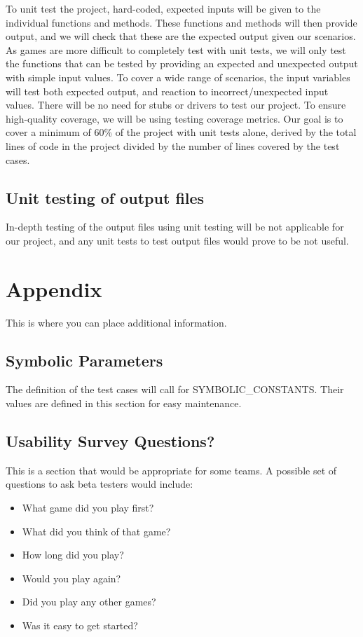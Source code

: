 \documentclass[12pt, titlepage]{article}
\begin{document}
To unit test the project, hard-coded, expected inputs will be given to the individual functions and methods. These functions and methods will then provide output, and we will check that these are the expected output given our scenarios. As games are more difficult to completely test with unit tests, we will only test the functions that can be tested by providing an expected and unexpected output with simple input values. To cover a wide range of scenarios, the input variables will test both expected output, and reaction to incorrect/unexpected input values. There will be no need for stubs or drivers to test our project. To ensure high-quality coverage, we will be using testing coverage metrics. Our goal is to cover a minimum of 60\% of the project with unit tests alone, derived by the total lines of code in the project divided by the number of lines covered by the test cases.
	
\subsection{Unit testing of output files}	

In-depth testing of the output files using unit testing will be not applicable for our project, and any unit tests to test output files would prove to be not useful.





\newpage

\section{Appendix}

This is where you can place additional information.

\subsection{Symbolic Parameters}

The definition of the test cases will call for SYMBOLIC\_CONSTANTS.
Their values are defined in this section for easy maintenance.

\subsection{Usability Survey Questions?}

This is a section that would be appropriate for some teams.
A possible set of questions to ask beta testers would include:
\begin{itemize}
    \item What game did you play first?
    \item What did you think of that game?
    \item How long did you play?
    \item Would you play again?
    \item Did you play any other games?
    \item Was it easy to get started?
\end{itemize}
\end{document}
